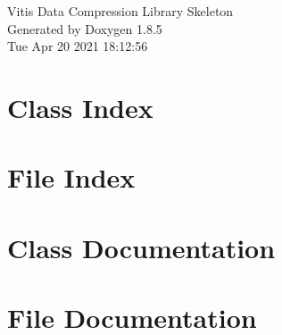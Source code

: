 \documentclass[twoside]{book}
\newcommand{\clearemptydoublepage}{%
  \newpage{\pagestyle{empty}\cleardoublepage}%
}
\begin{document}
\hypersetup{pageanchor=false}
\begin{titlepage}
\vspace*{7cm}
\begin{center}%
{\Large Vitis Data Compression Library Skeleton }\\
\vspace*{1cm}
{\large Generated by Doxygen 1.8.5}\\
\vspace*{0.5cm}
{\small Tue Apr 20 2021 18:12:56}\\
\end{center}
\end{titlepage}
\clearemptydoublepage
\tableofcontents
\clearemptydoublepage
{}
\hypersetup{pageanchor=true}

\chapter{Class Index}

\chapter{File Index}

\chapter{Class Documentation}


\chapter{File Documentation}

























\newpage
{}
{}
\printindex
\end{document}
